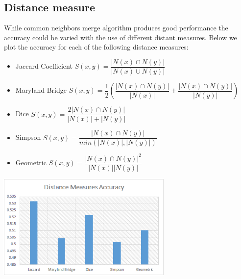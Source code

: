 \documentclass[journal]{IEEEtran}
\begin{document}
\subsection{Distance measure}
While common neighbors merge algorithm produces good performance the accuracy could be varied with the use of different distant measures. Below we plot the accuracy for each of the following distance measures:
\begin{itemize}
	\item Jaccard Coefficient $S(x,y)=\dfrac{|N(x) \cap N(y)|}{|N(x) \cup N(y)|}$
	\item Maryland Bridge $S(x,y)=\dfrac{1}{2} (\dfrac{|N(x) \cap N(y)|}{|N(x)|} + \dfrac{|N(x) \cap N(y)|}{|N(y)|})$
	\item Dice $S(x,y)=\dfrac{2|N(x) \cap N(y)|}{|N(x)| + |N(y)|}$
	\item Simpson $S(x,y)=\dfrac{|N(x) \cap N(y)|}{min(|N(x)|, |N(y)|)}$
	\item Geometric $S(x,y)=\dfrac{|N(x) \cap N(y)|^2}{|N(x)| |N(y)|}$
\end{itemize}

\includegraphics[width=3.4in,clip,keepaspectratio]{distance-measures}


%
%
\end{document}
